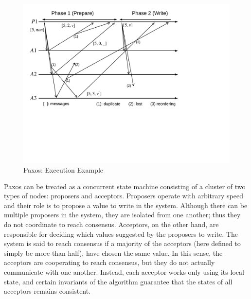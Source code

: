 \begin{figure}
\begin{center}
\includegraphics[scale=.34]{figs/multipaxos/paxos_example_nowitness}
\end{center}
\caption{Paxos: Execution Example}
\label{fig:paxos-example}
\end{figure}

Paxos can be treated as a concurrent state machine consisting of a cluster of two types of nodes: proposers and acceptors.
Proposers operate with arbitrary speed and their role is to propose a value to write in the system.
Although there can be multiple proposers in the system, they are isolated from one another;
thus they do not coordinate to reach consensus.
Acceptors, on the other hand, are responsible for deciding which values suggested by the proposers to write.
The system is said to reach consensus if a majority of the acceptors (here defined to simply be more than half), have chosen the same value.
In this sense, the acceptors are cooperating to reach consensus, but they do not actually communicate with one another.
Instead, each acceptor works only using its local state, and certain invariants of the algorithm guarantee that the states of all acceptors remains consistent.

